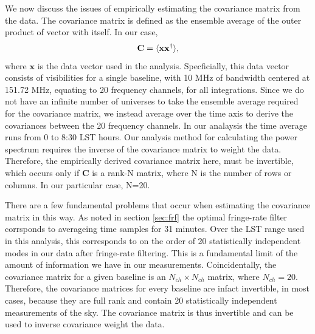 \documentclass[twocolumn,numberedappendix]{emulateapj} \shorttitle{PSA64}
\newcommand{\x}{\mathbf{x}} \newcommand{\xhat}{\hat{\mathbf{x}}}
\newcommand{\C}{\mathbf{C}} \newcommand{\Q}{\mathbf{Q}}
\begin{document}
We now discuss the issues of empirically estimating the covariance matrix from
the data. The covariance matrix is defined as the ensemble average of the outer
product of vector with itself. In our case, 
\begin{equation}
    \C = \expval{\x\x^{\dagger}}, 
\end{equation}
where $\x$ is the data vector used in the analysis. Specficially, this data
vector consists of visibilities for a single baseline, with 10 MHz of bandwidth
centered at 151.72 MHz, equating to 20 frequency channels, for all integrations.
Since we do not have an infinite number of universes to take the ensemble
average required for the covariance matrix, we instead average  over the time
axis to derive the covariances between the 20 frequency channels. In our
analaysis the time average runs from 0 to 8:30 LST hours. Our analysis method
for calculating the power spectrum requires the inverse of the covariance
matrix to weight the data. Therefore, the empirically derived covariance matrix
here, must be invertible, which occurs only if $\C$ is a rank-N matrix, where N
is the number of rows or columns. In our particular case, N=20.

There are a few fundamental problems that occur when estimating the covariance
matrix in this way. As noted in section \ref{sec:frf} the optimal fringe-rate
filter corrsponds to averageing time samples for 31 minutes. Over the LST range
used in this analysis, this corresponds to on the order of 20 statistically
independent modes in our data after fringe-rate filtering. This is a fundamental
limit of the amount of information we have in our measurements. Coincidentally,
the covariance matrix for a given baseline is an $N_{ch} \times N_{ch}$ matrix,
where $N_{ch}=20$.  Therefore, the covariance matrices for every baseline are
infact invertible, in most cases,  because they are full rank and contain 20
statistically independent measurements of the sky. The covariance matrix is thus
invertible and can be used to inverse covariance weight the data.
\end{document}
